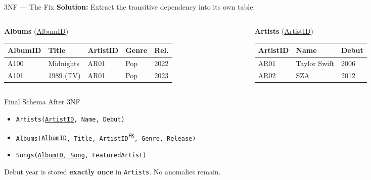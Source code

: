 \begin{frame}{3NF --- The Fix}
  \textbf{Solution:} Extract the transitive dependency into its own table.

  \vspace{0.5em}
  \begin{columns}[t]
    \begin{column}{0.52\textwidth}
      \textbf{Albums} (\underline{AlbumID})
      \small
      \begin{tabular}{lllll}
        \toprule
        \textbf{AlbumID} & \textbf{Title} & \textbf{ArtistID} & \textbf{Genre} & \textbf{Rel.} \\
        \midrule
        A100 & Midnights & AR01 & Pop & 2022 \\
        A101 & 1989 (TV) & AR01 & Pop & 2023 \\
        \bottomrule
      \end{tabular}
    \end{column}
    \begin{column}{0.42\textwidth}
      \textbf{Artists} (\underline{ArtistID})
      \small
      \begin{tabular}{lll}
        \toprule
        \textbf{ArtistID} & \textbf{Name} & \textbf{Debut} \\
        \midrule
        AR01 & Taylor Swift & 2006 \\
        AR02 & SZA          & 2012 \\
        \bottomrule
      \end{tabular}
    \end{column}
  \end{columns}

  \vspace{0.6em}
  \begin{block}{Final Schema After 3NF}
    \begin{itemize}
      \item \texttt{Artists(\underline{ArtistID}, Name, Debut)}
      \item \texttt{Albums(\underline{AlbumID}, Title, ArtistID\textsuperscript{FK}, Genre, Release)}
      \item \texttt{Songs(\underline{AlbumID, Song}, FeaturedArtist)}
    \end{itemize}
    Debut year is stored \textbf{exactly once} in \texttt{Artists}.
    No anomalies remain.
  \end{block}
\end{frame}

